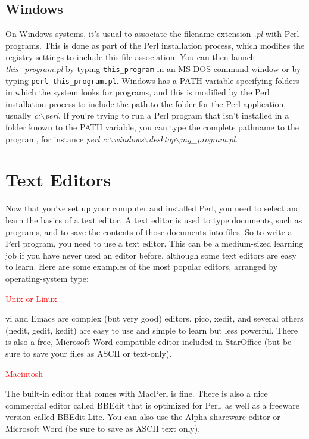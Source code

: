 \subsection{Windows}
On Windows systems, it's usual to associate the filename extension \textit{.pl} with Perl programs. This is done as part of the Perl installation process, which modifies the registry settings to include this file association. You can then launch \textit{this\_program.pl} by typing \verb|this_program| in an MS-DOS command window or by typing \verb|perl this_program.pl|. Windows has a PATH variable specifying folders in which the system looks for programs, and this is modified by the Perl installation process to include the path to the folder for the Perl application, usually \textit{c:$\backslash$perl}. If you're trying to run a Perl program that isn't installed in a folder known to the PATH variable, you can type the complete pathname to the program, for instance \textit{perl c:$\backslash$windows$\backslash$desktop$\backslash$my\_program.pl}.

\section{Text Editors}
Now that you've set up your computer and installed Perl, you need to select and learn the basics of a text editor. A text editor is used to type documents, such as programs, and to save the contents of those documents into files. So to write a Perl program, you need to use a text editor. This can be a medium-sized learning job if you have never used an editor before, although some text editors are easy to learn. Here are some examples of the most popular editors, arranged by operating-system type:

\textcolor{red}{Unix or Linux}
\begin{adjustwidth}{2em}{}
vi and Emacs are complex (but very good) editors. pico, xedit, and several others (nedit, gedit, kedit) are easy to use and simple to learn but less powerful. There is also a free, Microsoft Word-compatible editor included in StarOffice (but be sure to save your files as ASCII or text-only).
\end{adjustwidth}

\textcolor{red}{Macintosh}
\begin{adjustwidth}{2em}{}
The built-in editor that comes with MacPerl is fine. There is also a nice commercial editor called BBEdit that is optimized for Perl, as well as a freeware version called BBEdit Lite. You can also use the Alpha shareware editor or Microsoft Word (be sure to save as ASCII text only).
\end{adjustwidth}

